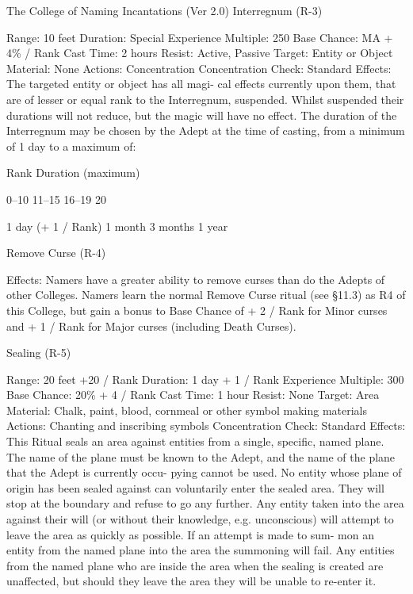 \begin{Chapter}{The College of Naming Incantations (Ver 2.0)}
Interregnum (R-3) 

Range: 10 feet 
Duration: Special 
Experience Multiple: 250 
Base Chance: MA + 4\% / Rank 
Cast Time: 2 hours 
Resist: Active, Passive 
Target: Entity or Object 
Material: None 
Actions: Concentration 
Concentration Check: Standard 
Effects: The targeted entity or object has all magi-
cal effects currently upon them, that are of lesser or 
equal  rank  to  the  Interregnum,  suspended.  Whilst 
suspended  their  durations  will  not  reduce,  but  the 
magic  will  have  no  effect.  The  duration  of  the 
Interregnum  may  be  chosen  by  the  Adept  at  the 
time  of  casting,  from  a  minimum  of  1  day  to  a 
maximum of: 

Rank  Duration (maximum) 

0–10 
11–15 
16–19 
20 

1 day (+ 1 / Rank) 
1 month 
3 months 
1 year 

Remove Curse (R-4) 

Effects: Namers have a greater ability to remove curses than do the
Adepts of other Colleges. Namers learn the normal Remove Curse ritual
(see §11.3) as R4 of this College, but gain a bonus to Base Chance of
+ 2 / Rank for Minor curses and + 1 / Rank for Major curses (including
Death Curses).

Sealing (R-5) 

Range: 20 feet +20 / Rank 
Duration: 1 day + 1 / Rank 
Experience Multiple: 300 
Base Chance: 20\% + 4 / Rank 
Cast Time: 1 hour 
Resist: None 
Target: Area 
Material:  Chalk,  paint,  blood,  cornmeal  or  other 
symbol making materials 
Actions: Chanting and inscribing symbols 
Concentration Check: Standard 
Effects:  This  Ritual  seals  an  area  against  entities 
from a single, specific, named plane. The name of 
the  plane  must  be  known  to  the  Adept,  and  the 
name of the plane that the Adept is currently occu-
pying  cannot  be  used.  No  entity  whose  plane  of 
origin has been sealed against can voluntarily enter 
the sealed area. They will stop at the boundary and 
refuse  to  go  any  further.  Any  entity  taken into  the 
area against their will (or without their knowledge, 
e.g.  unconscious)  will  attempt  to  leave  the  area  as 
quickly  as  possible.  If  an  attempt  is made  to  sum-
mon  an  entity  from  the  named  plane  into  the  area 
the  summoning  will  fail.  Any  entities  from  the 
named  plane  who  are  inside  the  area  when  the 
sealing  is  created  are  unaffected,  but  should  they 
leave the area they will be unable to re-enter it. 


\end{Chapter}
